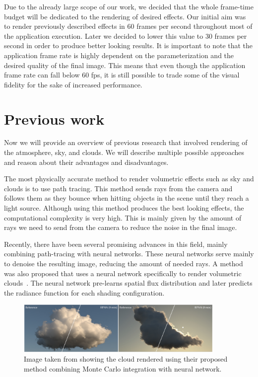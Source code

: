 \documentclass{ctuthesis}
\begin{document}
Due to the already large scope of our work, we decided that the whole frame-time 
budget will be dedicated to the rendering of desired effects. Our initial aim was to render
previously described effects in 60 frames per second throughout most of the application execution.
Later we decided to lower this value to 30 frames per second in order to produce better looking results.
It is important to note that the application frame rate is highly dependent on the parameterization and
the desired quality of the final image. This means that even though the application frame rate can fall 
below 60 fps, it is still possible to trade some of the visual fidelity for the sake of increased performance.


\section{Previous work}
Now we will provide an overview of previous research that involved rendering of the atmosphere, sky, and clouds.
We will describe multiple possible approaches and reason about their advantages and disadvantages.

The most physically accurate method to render volumetric effects such as sky and clouds is to use 
path tracing. This method sends rays from the camera and follows them as they bounce when hitting 
objects in the scene until they reach a light source. Although using this method produces the best
looking effects, the computational complexity is very high. This is mainly given by the amount of rays
we need to send from the camera to reduce the noise in the final image.

Recently, there have been several promising advances in this field, mainly combining path-tracing with neural networks.
These neural networks serve mainly to denoise the resulting image, reducing the amount of needed rays.
A method was also proposed that uses a neural network specifically to render volumetric clouds~\cite{kallweit2017deep}.
The neural network pre-learns spatial flux distribution and later predicts the radiance function for each 
shading configuration.

\begin{figure}
    \includegraphics[width=0.9\textwidth]{media/PathTracedCloud.png}
    \caption[Cloud by~\cite{kallweit2017deep}]{Image taken from \cite{kallweit2017deep} showing the cloud rendered using their proposed
        method combining Monte Carlo integration with neural network.}
    \label{fig:pathtraced volumetric cloud}
\end{figure}
\end{document}
